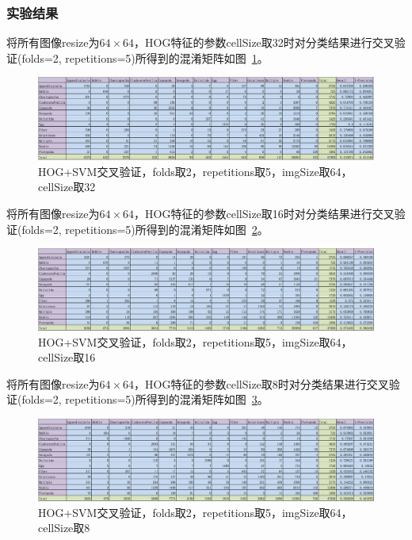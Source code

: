 \documentclass[12pt]{article}
\begin{document}
\subsubsection{实验结果}
将所有图像resize为$64 \times 64$，HOG特征的参数cellSize取32时对分类结果进行交叉验证(folds=2, repetitions=5)所得到的混淆矩阵如图~\ref{fig:HOG-SVM-2-folds-5-repetitions-32-64-noNoise}。
\begin{figure}[!ht]
\centering
\includegraphics[width=1.0\linewidth]{HOG-SVM-2-folds-5-repetitions-32-64-noNoise}
\caption{HOG+SVM交叉验证，folds取2，repetitions取5，imgSize取64，cellSize取32}
\label{fig:HOG-SVM-2-folds-5-repetitions-32-64-noNoise}
\end{figure}

将所有图像resize为$64 \times 64$，HOG特征的参数cellSize取16时对分类结果进行交叉验证(folds=2, repetitions=5)所得到的混淆矩阵如图~\ref{fig:HOG-SVM-2-folds-5-repetitions-16-64-noNoise}。
\begin{figure}[!ht]
\centering
\includegraphics[width=1.0\linewidth]{HOG-SVM-2-folds-5-repetitions-16-64-noNoise}
\caption{HOG+SVM交叉验证，folds取2，repetitions取5，imgSize取64，cellSize取16}
\label{fig:HOG-SVM-2-folds-5-repetitions-16-64-noNoise}
\end{figure}

将所有图像resize为$64 \times 64$，HOG特征的参数cellSize取8时对分类结果进行交叉验证(folds=2, repetitions=5)所得到的混淆矩阵如图~\ref{fig:HOG-SVM-2-folds-5-repetitions-8-64-noNoise}。
\begin{figure}[!ht]
\centering
\includegraphics[width=1.0\linewidth]{HOG-SVM-2-folds-5-repetitions-8-64-noNoise}
\caption{HOG+SVM交叉验证，folds取2，repetitions取5，imgSize取64，cellSize取8}
\label{fig:HOG-SVM-2-folds-5-repetitions-8-64-noNoise}
\end{figure}
\end{document}
